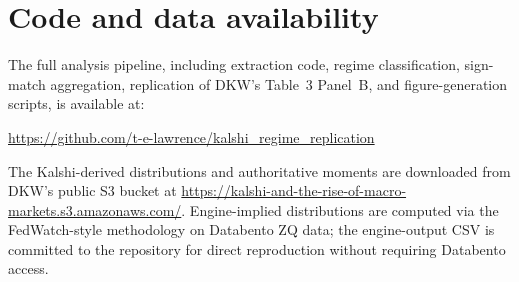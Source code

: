 \documentclass[11pt]{article}
\begin{document}
\section*{Code and data availability}

The full analysis pipeline, including extraction code, regime
classification, sign-match aggregation, replication of DKW's Table~3
Panel~B, and figure-generation scripts, is available at:
\begin{center}\url{https://github.com/t-e-lawrence/kalshi_regime_replication}\end{center}

The Kalshi-derived distributions and authoritative moments are
downloaded from DKW's public S3 bucket at
\url{https://kalshi-and-the-rise-of-macro-markets.s3.amazonaws.com/}.
Engine-implied distributions are computed via the FedWatch-style
methodology on Databento ZQ data; the engine-output CSV is committed
to the repository for direct reproduction without requiring Databento
access.



\end{document}
